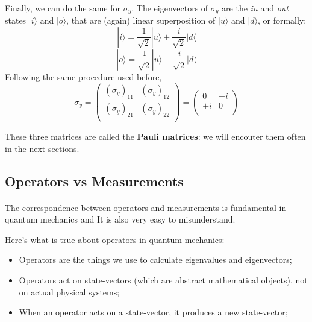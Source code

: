 \documentclass[a4paper,10pt]{article}
\begin{document}
\paragraph{} Finally, we can do the same for $\sigma_y$. The eigenvectors of $\sigma_y$ are the \textit{in} and \textit{out} states $|i\rangle$ and $|o\rangle$, that are (again) linear superposition of $|u\rangle$ and $|d\rangle$, or formally:
$$|i\rangle = \frac{1}{\sqrt{2}}|u\rangle + \frac{i}{\sqrt{2}}|d\langle$$
$$|o\rangle = \frac{1}{\sqrt{2}}|u\rangle - \frac{i}{\sqrt{2}}|d\langle$$
Following the same procedure used before, 
\begin{equation*}
\sigma_y = \left(\begin{matrix}
    (\sigma_y)_{11} & (\sigma_y)_{12} \\
    (\sigma_y)_{21} & (\sigma_y)_{22} \\
\end{matrix}\right) = \left(\begin{matrix}
    0 & -i \\
    +i & 0 \\
\end{matrix}\right)
\end{equation*}

These three matrices are called the \textbf{Pauli matrices}: we will encouter them often in the next sections.

\subsection{Operators vs Measurements}

\paragraph{} The correspondence between operators and measurements is fundamental in quantum mechanics and It is also very easy to misunderstand.

Here's what is true about operators in quantum mechanics:
\begin{itemize}
    \item Operators are the things we use to calculate eigenvalues and eigenvectors;
    \item Operators act on state-vectors (which are abstract mathematical objects), not on actual physical systems;
    \item When an operator acts on a state-vector, it produces a new state-vector;
\end{itemize}
\end{document}
